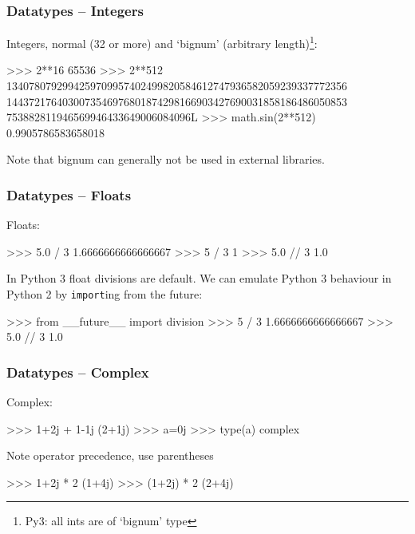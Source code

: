 \documentclass[xetex,10pt]{beamer}
\def\pythoni{\lstinline[language=pythontim]}
\def\spacer{\vspace*{1em}}
\newcommand{\pypypy}[1]{\footnote[frame]{Py3: #1}}
\begin{document}
\begin{frame}[fragile]
	\frametitle{Datatypes -- Integers}

	Integers, normal (32 or more) and `bignum' (arbitrary length)\pypypy{all ints are of `bignum' type}:

	\spacer

\begin{python}
>>> 2**16
65536
>>> 2**512
1340780792994259709957402499820584612747936582059239337772356
1443721764030073546976801874298166903427690031858186486050853
753882811946569946433649006084096L
>>> math.sin(2**512)
0.9905786583658018
\end{python}

	\spacer

Note that bignum can generally not be used in external libraries.
\end{frame}


\begin{frame}[fragile]
	\frametitle{Datatypes -- Floats}

Floats:
\begin{python}
>>> 5.0 / 3
1.6666666666666667
>>> 5 / 3
1
>>> 5.0 // 3
1.0
\end{python}

\spacer

\pause
In Python 3 float divisions are default. 
We can emulate Python 3 behaviour in Python 2 by \pythoni{import}ing from the future:

\begin{python}
>>> from __future__ import division
>>> 5 / 3
1.6666666666666667
>>> 5.0 // 3
1.0
\end{python}

\end{frame}


\begin{frame}[fragile]
	\frametitle{Datatypes -- Complex}

Complex:
\begin{python}
>>> 1+2j + 1-1j
(2+1j)
>>> a=0j
>>> type(a)
complex
\end{python}

\spacer

Note operator precedence, use parentheses
\begin{python}
>>> 1+2j * 2
(1+4j)
>>> (1+2j) * 2
(2+4j)
\end{python}

\end{frame}
\end{document}
